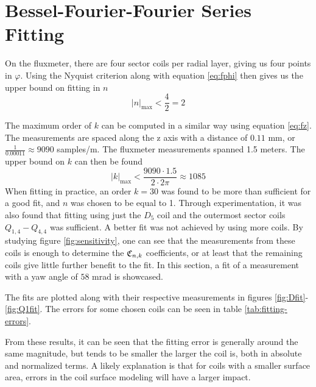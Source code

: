 \section{Bessel-Fourier-Fourier Series Fitting}
On the fluxmeter, there are four
sector coils per radial layer, giving us four points in $\varphi$.
Using the Nyquist criterion along with equation \ref{eq:fphi}
then gives us the upper bound on fitting in $n$
\begin{equation}
    |n|_{\text{max}} < \frac{4}{2} = 2
\end{equation}

The maximum order of $k$ can be computed in a similar way
using equation \ref{eq:fz}.
The measurements are spaced
along the z axis with a distance of $0.11$ mm, or
$\frac{1}{0.00011} \approx 9090$ samples/m. The fluxmeter
measurements spanned 1.5 meters.
The upper bound on $k$ can then be found
\begin{equation}
    |k|_{\text{max}} < \frac{9090\cdot 1.5}{2\cdot 2\pi} \approx 1085
\end{equation}
When fitting in practice, an order $k=30$ was found to be
more than sufficient for a good fit, and $n$ was chosen to
be equal to 1. Through experimentation, it was also found
that fitting using just the $D_5$ coil and the outermost
sector coils $Q_{1,4}-Q_{4,4}$ was sufficient. A better fit
was not achieved by using more coils. By studying figure
\ref{fig:sensitivity}, one can see that the measurements
from these coils is enough to determine the $\mathfrak{C}_{n,k}$
coefficients, or at least that the remaining coils give
little further benefit to the fit. In this section, a
fit of a measurement with a yaw angle of $58$ mrad is
showcased.

The fits are plotted along with their respective measurements
in figures \ref{fig:Dfit}-\ref{fig:Q1fit}. The errors for
some chosen coils can be seen in table \ref{tab:fitting-errors}.

From these results, it can be seen that the
fitting error is generally around the same magnitude, but tends
to be smaller the larger the coil is, both in absolute and
normalized terms. A likely explanation is that for coils 
with a smaller surface area, errors in the coil surface
modeling will have a larger impact.

